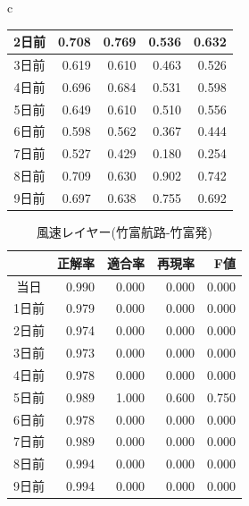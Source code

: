 \begin{table}[htbp]
\begin{center}
\begin{tabular}{c}
\begin{minipage}{0.5\hsize}
\begin{center}
\begin{tabular}{|c|r|r|r|r|}
      2日前 & 0.708 & 0.769 & 0.536 & 0.632 \\ \hline
      3日前 & 0.619 & 0.610 & 0.463 & 0.526 \\ \hline 
      4日前 & 0.696 & 0.684 & 0.531 & 0.598 \\ \hline 
      5日前 & 0.649 & 0.610 & 0.510 & 0.556 \\ \hline 
      6日前 & 0.598 & 0.562 & 0.367 & 0.444 \\ \hline 
      7日前 & 0.527 & 0.429 & 0.180 & 0.254 \\ \hline 
      8日前 & 0.709 & 0.630 & 0.902 & 0.742 \\ \hline 
      9日前 & 0.697 & 0.638 & 0.755 & 0.692 \\ \hline 
          \end{tabular}
          \label{img_wind_iriue}
        \end{center}
      \end{minipage}

    \end{tabular}
  \end{center}
\end{table}

\begin{table}[H]
  \begin{center}
    \caption{風速レイヤー(竹富航路-竹富発)}
    \begin{tabular}{|c|r|r|r|r|} \hline
   &正解率 & 適合率 & 再現率 & F値 \\ \hline
      当日 & 0.990 & 0.000 & 0.000 & 0.000 \\ \hline
     1日前 & 0.979 & 0.000 & 0.000 & 0.000 \\ \hline
      2日前 & 0.974 & 0.000 & 0.000 & 0.000 \\ \hline
      3日前 & 0.973 & 0.000 & 0.000 & 0.000 \\ \hline 
      4日前 & 0.978 & 0.000 & 0.000 & 0.000 \\ \hline 
      5日前 & 0.989 & 1.000 & 0.600 & 0.750 \\ \hline 
      6日前 & 0.978 & 0.000 & 0.000 & 0.000 \\ \hline 
      7日前 & 0.989 & 0.000 & 0.000 & 0.000 \\ \hline 
      8日前 & 0.994 & 0.000 & 0.000 & 0.000 \\ \hline 
      9日前 & 0.994 & 0.000 & 0.000 & 0.000 \\ \hline 
    \end{tabular}
    \label{img_wind_taketomi}
  \end{center}
\end{table}


